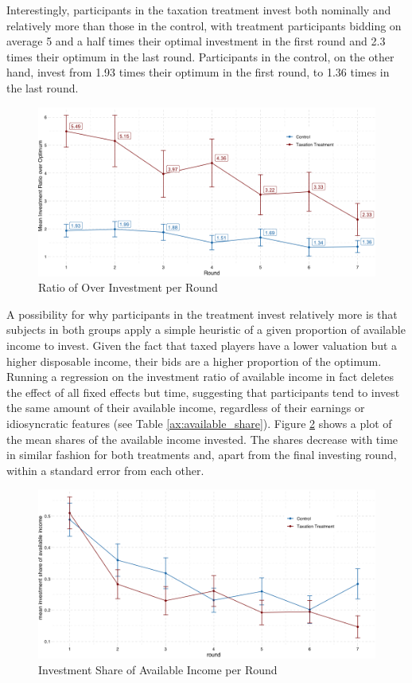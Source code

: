 Interestingly, participants in the taxation treatment invest both nominally and relatively more than those in the control, with treatment participants bidding on average 5 and a half times their optimal investment in the first round and 2.3 times their optimum in the last round. Participants in the control, on the other hand, invest from 1.93 times their optimum in the first round, to 1.36 times in the last round.\\


\begin{figure}
    \centering
    \includegraphics[width=\textwidth]{graphs/over_invest.png}
    \caption{Ratio of Over Investment per Round}
    \label{fig:over_invest}
\end{figure}


A possibility for why participants in the treatment invest relatively more is that subjects in both groups apply a simple heuristic of a given proportion of available income to invest. Given the fact that taxed players have a lower valuation but a higher disposable income, their bids are a higher proportion of the optimum. Running a regression on the investment ratio of available income in fact deletes the effect of all fixed effects but time, suggesting that participants tend to invest the same amount of their available income, regardless of their earnings or idiosyncratic features (see Table \ref{ax:available_share}). Figure \ref{fig:invest_share} shows a plot of the mean shares of the available income invested. The shares decrease with time in similar fashion for both treatments and, apart from the final investing round, within a standard error from each other.\\

\begin{figure}[H]
    \centering
    \includegraphics[width=\textwidth]{graphs/investment_share_geom_line.png}
    \caption{Investment Share of Available Income per Round}
    \label{fig:invest_share}
\end{figure}

